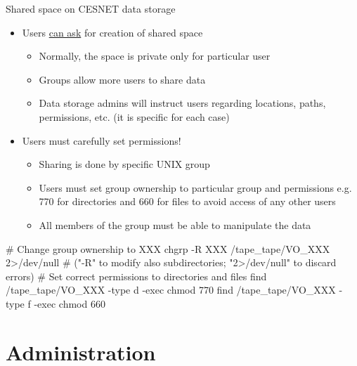 \documentclass[compress, ucs, xelatex, 11pt, xcolor=svgnames,
  hyperref={
    bookmarks=true,
    unicode=true,
    colorlinks=true,
    pdftitle={Linux, command line and MetaCentrum},
    plainpages=false,
    pdfauthor={Vojtech Zeisek},
    pdfsubject={Course about use of Linux command line, writing shell scripts and using MetaCentrum of CESNET},
    pdfcreator={XeLaTeX},
    pdfkeywords={Linux, GNU, BASH, shell, command line, MetaCentrum},
    linkcolor=DarkRed,
    anchorcolor=DarkBlue,
    citecolor=Indigo,
    filecolor=NavyBlue,
    menucolor=DarkMagenta,
    urlcolor=DarkBlue,
    pdftex},
  url={hyphens, lowtilde} %
  ]{beamer}
\begin{document}
\begin{frame}[fragile]{Shared space on CESNET data storage}
  \begin{itemize}
    \item Users \href{https://du.cesnet.cz/en/uzivatelska_podpora/start}{can ask} for creation of shared space
    \begin{itemize}
      \item Normally, the space is private only for particular user
      \item Groups allow more users to share data
      \item Data storage admins will instruct users regarding locations, paths, permissions, etc. (it is specific for each case)
    \end{itemize}
    \item Users must carefully set permissions!
    \begin{itemize}
      \item Sharing is done by specific UNIX group
      \item Users must set group ownership to particular group and permissions e.g. 770 for directories and 660 for files to avoid access of any other users
      \item All members of the group must be able to manipulate the data
    \end{itemize}
  \end{itemize}
  \begin{bashcode}
    # Change group ownership to XXX
    chgrp -R XXX /tape_tape/VO_XXX 2>/dev/null
    # ("-R" to modify also subdirectories; "2>/dev/null" to discard errors)
    # Set correct permissions to directories and files
    find /tape_tape/VO_XXX -type d -exec chmod 770 {} \;
    find /tape_tape/VO_XXX -type f -exec chmod 660 {} \;
  \end{bashcode}
\end{frame}



\section{Administration}
\end{document}
